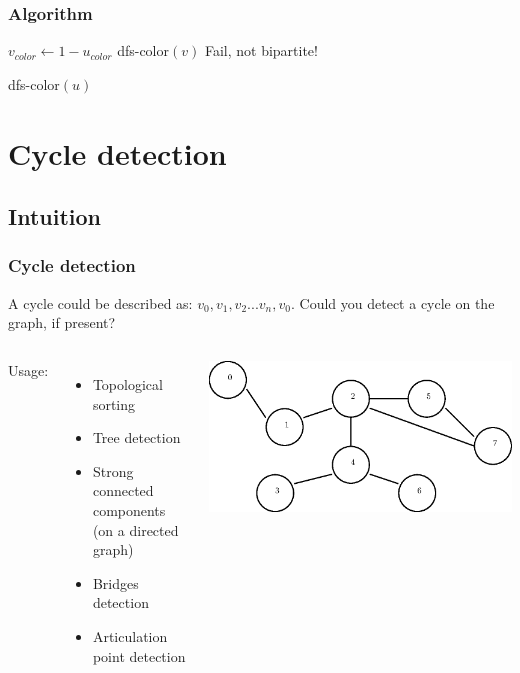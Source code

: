 \documentclass[article]{beamer}
\begin{document}
\begin{frame}
	\frametitle{Algorithm}
	\begin{algorithm}[H]
		\begin{algorithmic}[1]
		\STATE $v_{color} \gets 1 - u_{color}$
		\STATE dfs-color$(v)$
		\STATE Fail, not bipartite!
		\ENDIF
		\ENDFOR
		\end{algorithmic}
		\caption{dfs-color$(u)$}
		\label{alg:seq}
		\end{algorithm}
\end{frame}


\section{Cycle detection}
\subsection{Intuition}
\begin{frame}
	\frametitle{Cycle detection}
	A cycle could be described as: \textbf{$v_{0}, v_{1}, v_{2} ... v_{n}, v_{0}$}. Could you detect a cycle on the graph, if present?
	
	\vspace{5mm}
	
	\begin{columns}
	Usage:
	\begin{itemize}
		\item Topological sorting
		\item Tree detection
		\item Strong connected components (on a directed graph)
		\item Bridges detection 
		\item Articulation point detection
	\end{itemize}
	\includegraphics[scale=0.4]{./figures/path_cycle.eps}
	\end{columns}
\end{frame}
\end{document}
